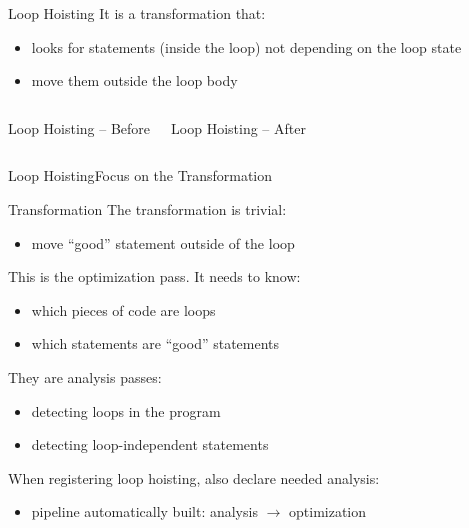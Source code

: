 \documentclass[10pt,mathserif]{beamer}
\newcommand{\cinput}[1]{}
\begin{document}
\begin{frame}{Loop Hoisting}
It is a transformation that:
\begin{itemize}
\item looks for statements (inside the loop) not depending on the loop state
\item move them outside the loop body
\end{itemize}

\begin{columns}[t]
\begin{block}{Loop Hoisting -- Before}
\centering
\cinput{snippet/01/loop-hoisting-before.c}
\end{block}

\begin{block}{Loop Hoisting -- After}
\centering
\cinput{snippet/01/loop-hoisting-after.c}
\end{block}
\end{columns}
\end{frame}


\begin{frame}{Loop Hoisting}{Focus on the Transformation}
\begin{block}{Transformation}
The transformation is trivial:
\begin{itemize}
\item move ``good'' statement outside of the loop
\end{itemize}
\end{block}
This is the \alert{optimization pass}. It needs to know:

\begin{itemize}
\item which pieces of code are loops
\item which statements are ``good'' statements
\end{itemize}

They are \alert{analysis} passes:

\begin{itemize}
\item detecting loops in the program
\item detecting loop-independent statements
\end{itemize}

When registering loop hoisting, also declare needed analysis:

\begin{itemize}
\item pipeline automatically built: analysis $\rightarrow$ optimization
\end{itemize}
\end{frame}
\end{document}
